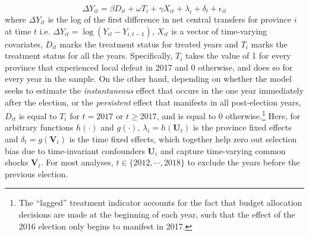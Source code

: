 \documentclass[12pt]{article}
\newcommand{\1}{\mathbbm{1}}
\begin{document}
\begin{equation}
\Delta Y_{it} = \beta D_{it} + \omega T_{i} + \gamma X_{it} + \lambda_i + \delta_t + \epsilon_{it} \label{eq:FE}
\end{equation}
where $\Delta Y_{it}$ is the log of the first difference in net central transfers for province $i$ at time $t$ i.e. $\Delta Y_{it} = \log(Y_{it} - Y_{i, t-1})$, $X_{it}$ is a vector of time-varying covariates, $D_{it}$ marks the treatment status for treated years and $T_{i}$ marks the treatment status for all the years. Specifically, $T_{i}$ takes the value of 1 for every province that experienced local defeat in 2017 and 0 otherwise, and does so for every year in the sample. On the other hand, depending on whether the model seeks to estimate the \textit{instantaneous} effect that occurs in the one year immediately after the election, or the \textit{persistent} effect that manifests in all post-election years, $D_{it}$ is equal to $T_{i}$ for $t=2017$ or $t\geq2017$, and is equal to $0$ otherwise.\footnote{The ``lagged'' treatment indicator accounts for the fact that budget allocation decisions are made at the beginning of each year, such that the effect of the 2016 election only begins to manifest in 2017.} Here, for arbitrary functions $h(\cdot)$ and $g(\cdot)$, $\lambda_i = h(\mathbf{U}_t)$ is the province fixed effects and $\delta_t = g(\mathbf{V}_t)$ is the time fixed effects, which together help zero out selection bias due to time-invariant confounders $\mathbf{U}_i$ and capture time-varying common shocks $\mathbf{V}_t$. For most analyses, $t \in \{2012, \cdots, 2018\}$ to exclude the years before the previous election.
\end{document}
